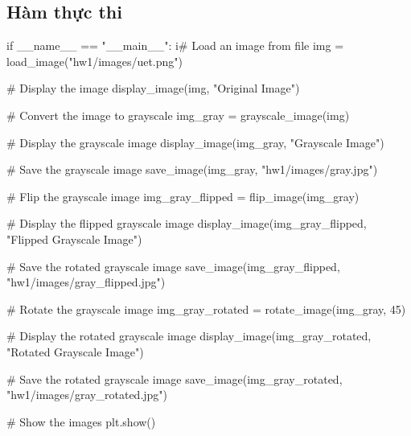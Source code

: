 \documentclass[a4paper]{article}
\begin{document}
\subsection{Hàm thực thi}
\begin{python}
if __name__ == "__main__":
    i# Load an image from file
    img = load_image("hw1/images/uet.png")

    # Display the image
    display_image(img, "Original Image")

    # Convert the image to grayscale
    img_gray = grayscale_image(img)

    # Display the grayscale image
    display_image(img_gray, "Grayscale Image")

    # Save the grayscale image
    save_image(img_gray, "hw1/images/gray.jpg")

    # Flip the grayscale image
    img_gray_flipped = flip_image(img_gray)

    # Display the flipped grayscale image
    display_image(img_gray_flipped, "Flipped Grayscale Image")

    # Save the rotated grayscale image
    save_image(img_gray_flipped, "hw1/images/gray_flipped.jpg")

    # Rotate the grayscale image
    img_gray_rotated = rotate_image(img_gray, 45)

    # Display the rotated grayscale image
    display_image(img_gray_rotated, "Rotated Grayscale Image")

    # Save the rotated grayscale image
    save_image(img_gray_rotated, "hw1/images/gray_rotated.jpg")

    # Show the images
    plt.show() 
\end{python}
\end{document}
